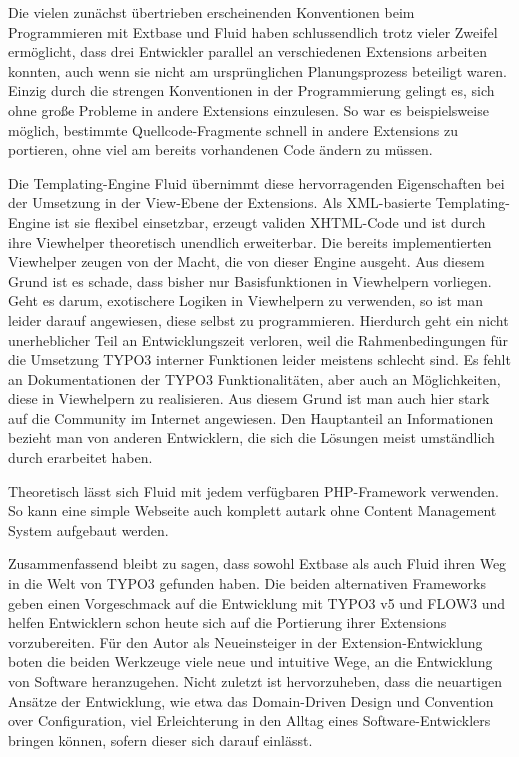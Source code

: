 Die vielen zun\"achst \"ubertrieben erscheinenden Konventionen beim Programmieren mit Extbase und Fluid haben schlussendlich trotz vieler Zweifel erm\"oglicht, dass drei Entwickler parallel an verschiedenen Extensions arbeiten konnten, auch wenn sie nicht am urspr\"unglichen Planungsprozess beteiligt waren. Einzig durch die strengen Konventionen in der Programmierung gelingt es, sich ohne gro{\ss}e Probleme in andere Extensions einzulesen. So war es beispielsweise m\"oglich, bestimmte Quellcode-Fragmente schnell in andere Extensions zu portieren, ohne viel am bereits vorhandenen Code \"andern zu m\"ussen.

Die Templating-Engine Fluid \"ubernimmt diese hervorragenden Eigenschaften bei der Umsetzung in der View-Ebene der Extensions. Als XML-basierte Templating-Engine ist sie flexibel einsetzbar, erzeugt validen XHTML-Code und ist durch ihre Viewhelper theoretisch unendlich erweiterbar. Die bereits implementierten Viewhelper zeugen von der Macht, die von dieser Engine ausgeht. Aus diesem Grund ist es schade, dass bisher nur Basisfunktionen in Viewhelpern vorliegen. Geht es darum, exotischere Logiken in Viewhelpern zu verwenden, so ist man leider darauf angewiesen, diese selbst zu programmieren. Hierdurch geht ein nicht unerheblicher Teil an Entwicklungszeit verloren, weil die Rahmenbedingungen f\"ur die Umsetzung TYPO3 interner Funktionen leider meistens schlecht sind. Es fehlt an Dokumentationen der TYPO3 Funktionalit\"aten, aber auch an M\"oglichkeiten, diese in Viewhelpern zu realisieren. Aus diesem Grund ist man auch hier stark auf die Community im Internet angewiesen. Den Hauptanteil an Informationen bezieht man von anderen Entwicklern, die sich die L\"osungen meist umst\"andlich durch  erarbeitet haben.


Theoretisch l\"asst sich Fluid mit jedem verf\"ugbaren PHP-Framework verwenden. So kann eine simple Webseite auch komplett autark ohne Content Management System aufgebaut werden.


Zusammenfassend bleibt zu sagen, dass sowohl Extbase als auch Fluid ihren Weg in die Welt von TYPO3 gefunden haben. Die beiden alternativen Frameworks geben einen Vorgeschmack auf die Entwicklung mit TYPO3 v5 und FLOW3 und helfen Entwicklern schon heute sich auf die Portierung ihrer Extensions vorzubereiten. F\"ur den Autor als Neueinsteiger in der Extension-Entwicklung boten die beiden Werkzeuge viele neue und intuitive Wege, an die Entwicklung von Software heranzugehen. Nicht zuletzt ist hervorzuheben, dass die neuartigen Ans\"atze der Entwicklung, wie etwa das Domain-Driven Design und Convention over Configuration, viel Erleichterung in den Alltag eines Software-Entwicklers bringen k\"onnen, sofern dieser sich darauf einl\"asst.



